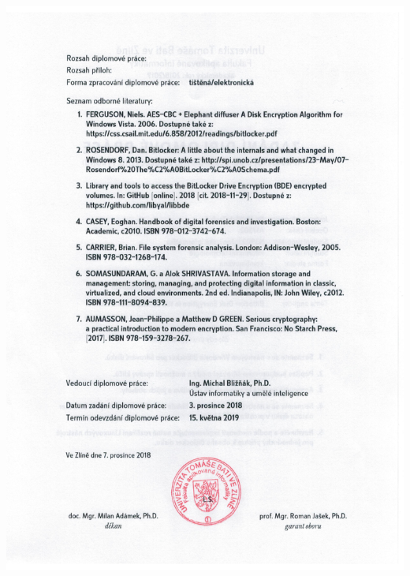 {	\clearpage
	\thispagestyle{empty}
	\includegraphics[scale=0.75]{img/zadani2.png}
}

\newcommand{\aktivujZahlavi}{
	\renewcommand{\headrulewidth}{1pt}
	\rhead{\thepage}
	
	\ifczech
		\lhead{\b{UTB ve Zlíně, \ifthenelse{\equal{\fakulta}{FAI}}{Fakulta aplikované informatiky}{\ifthenelse{\equal{\fakulta}{FAME}}{Fakulta managementu a ekonomiky}{\ifthenelse{\equal{\fakulta}{FHS}}{Fakulta humanitních studií}{\ifthenelse{\equal{\fakulta}{FLKR}}{Fakulta logistiky a krizového řízení}{\ifthenelse{\equal{\fakulta}{FMK}}{Fakulta multimediálních komunikací}{\ifthenelse{\equal{\fakulta}{FT}}{Fakulta technologická}{\ifthenelse{\equal{\fakulta}{UNI}}{Univerzitní institut}{}}}}}}}}}
	\else \ifenglish
		\lhead{\b{TBU in Zlín, \ifthenelse{\equal{\fakulta}{FAI}}{Faculty of Applied Informatics}{\ifthenelse{\equal{\fakulta}{FAME}}{Faculty of Management and Economics}{\ifthenelse{\equal{\fakulta}{FHS}}{Faculty of Humanities}{\ifthenelse{\equal{\fakulta}{FLKR}}{Faculty of Logistics and Crisis Management}{\ifthenelse{\equal{\fakulta}{FMK}}{Faculty of Multimedia Communications}{\ifthenelse{\equal{\fakulta}{FT}}{Faculty of Technology}{\ifthenelse{\equal{\fakulta}{UNI}}{University Institute}{}}}}}}}}}
	\fi \fi
}

